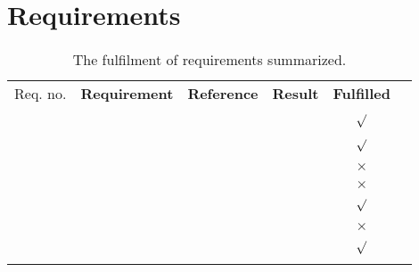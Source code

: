 \chapter{Requirements}
\label{Requirements}

 \bfseries
\begin{table}[H]\hspace*{-1cm}
\centering
\begin{tabular}{|c|c|c|c|c|c|} \hline
\rowcolor{lightgray}  Req. no. 	& \bfseries Requirement 					&  \bfseries Reference											&\bfseries Result   &\bfseries Fulfilled\\ 
\rowcolor{lightgray}			&											&  																&					&	 				\\ \hline
	
	& &  							&  & $\surd$			\\ 
 								& 				& 			&	 				&					\\ \hline
%
	& &  						& 	& $\surd$			\\ 
								& & &					&					\\ \hline
%
	& & & & $\times$	\\ 
								& 						& &					&					\\ \hline
%
	& & & & $\times$		\\ 
								& 						& &					&					\\ \hline
%									
	& & & & $\surd$		\\ 
								& 	 				&& 				&					\\ \hline
%
	& & 		& & $\times$	\\ 
								& 						& 		 						&					&					\\ \hline
%
	& && & $\surd$		\\
								& 	& & 				&					\\ \hline
\end{tabular}
\caption{The fulfilment of requirements summarized.}	
\label{table:accept_test_table}
\end{table}

